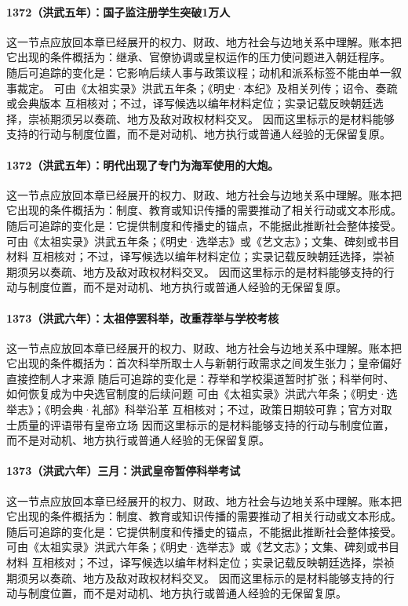 \paragraph{1372（洪武五年）：国子监注册学生突破1万人} 这一节点应放回本章已经展开的权力、财政、地方社会与边地关系中理解。账本把它出现的条件概括为：继承、官僚协调或皇权运作的压力使问题进入朝廷程序。 随后可追踪的变化是：它影响后续人事与政策议程；动机和派系标签不能由单一叙事裁定。 可由《太祖实录》洪武五年条；《明史·本纪》及相关列传；诏令、奏疏或会典版本 互相核对；不过，译写候选以编年材料定位；实录记载反映朝廷选择，崇祯期须另以奏疏、地方及敌对政权材料交叉。 因而这里标示的是材料能够支持的行动与制度位置，而不是对动机、地方执行或普通人经验的无保留复原。

\paragraph{1372（洪武五年）：明代出现了专门为海军使用的大炮。} 这一节点应放回本章已经展开的权力、财政、地方社会与边地关系中理解。账本把它出现的条件概括为：制度、教育或知识传播的需要推动了相关行动或文本形成。 随后可追踪的变化是：它提供制度和传播史的锚点，不能据此推断社会整体接受。 可由《太祖实录》洪武五年条；《明史·选举志》或《艺文志》；文集、碑刻或书目材料 互相核对；不过，译写候选以编年材料定位；实录记载反映朝廷选择，崇祯期须另以奏疏、地方及敌对政权材料交叉。 因而这里标示的是材料能够支持的行动与制度位置，而不是对动机、地方执行或普通人经验的无保留复原。

\paragraph{1373（洪武六年）：太祖停罢科举，改重荐举与学校考核} 这一节点应放回本章已经展开的权力、财政、地方社会与边地关系中理解。账本把它出现的条件概括为：首次科举所取士人与新朝行政需求之间发生张力；皇帝偏好直接控制人才来源 随后可追踪的变化是：荐举和学校渠道暂时扩张；科举何时、如何恢复成为中央选官制度的后续问题 可由《太祖实录》洪武六年条；《明史·选举志》；《明会典·礼部》科举沿革 互相核对；不过，政策日期较可靠；官方对取士质量的评语带有皇帝立场 因而这里标示的是材料能够支持的行动与制度位置，而不是对动机、地方执行或普通人经验的无保留复原。

\paragraph{1373（洪武六年）三月：洪武皇帝暂停科举考试} 这一节点应放回本章已经展开的权力、财政、地方社会与边地关系中理解。账本把它出现的条件概括为：制度、教育或知识传播的需要推动了相关行动或文本形成。 随后可追踪的变化是：它提供制度和传播史的锚点，不能据此推断社会整体接受。 可由《太祖实录》洪武六年条；《明史·选举志》或《艺文志》；文集、碑刻或书目材料 互相核对；不过，译写候选以编年材料定位；实录记载反映朝廷选择，崇祯期须另以奏疏、地方及敌对政权材料交叉。 因而这里标示的是材料能够支持的行动与制度位置，而不是对动机、地方执行或普通人经验的无保留复原。

